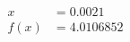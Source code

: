 \documentclass[preview]{standalone}
\begin{document}
\begin{align*}
x &= 0.0021\\f(x) &= 4.0106852
\end{align*}
\end{document}
